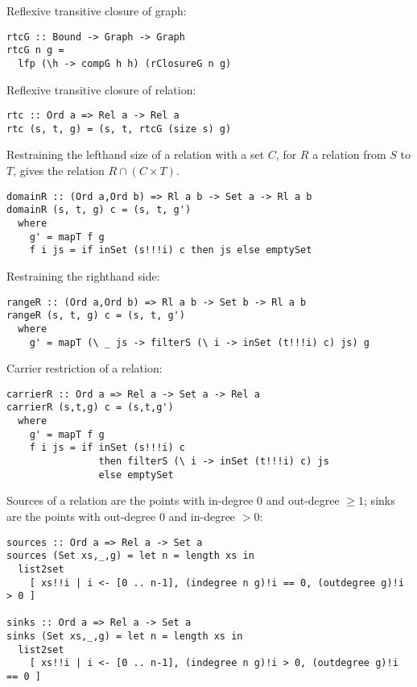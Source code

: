 Reflexive transitive closure of graph: 

\bc\begin{verbatim}
rtcG :: Bound -> Graph -> Graph 
rtcG n g = 
  lfp (\h -> compG h h) (rClosureG n g)
\end{verbatim}\ec

Reflexive transitive closure of relation:

\bc\begin{verbatim}
rtc :: Ord a => Rel a -> Rel a
rtc (s, t, g) = (s, t, rtcG (size s) g)
\end{verbatim}\ec

Restraining the lefthand size of a relation with a set $C$, 
for $R$ a relation  from $S$ to $T$, gives the relation 
 $R \cap (C \times T)$. 

\bc\begin{verbatim}
domainR :: (Ord a,Ord b) => Rl a b -> Set a -> Rl a b 
domainR (s, t, g) c = (s, t, g') 
  where 
    g' = mapT f g
    f i js = if inSet (s!!!i) c then js else emptySet
\end{verbatim}\ec

Restraining the righthand side: 

\bc\begin{verbatim}
rangeR :: (Ord a,Ord b) => Rl a b -> Set b -> Rl a b 
rangeR (s, t, g) c = (s, t, g') 
  where 
    g' = mapT (\ _ js -> filterS (\ i -> inSet (t!!!i) c) js) g
\end{verbatim}\ec

Carrier restriction of a relation: 

\bc\begin{verbatim}
carrierR :: Ord a => Rel a -> Set a -> Rel a 
carrierR (s,t,g) c = (s,t,g') 
  where 
    g' = mapT f g
    f i js = if inSet (s!!!i) c
                then filterS (\ i -> inSet (t!!!i) c) js 
                else emptySet
\end{verbatim}\ec

Sources of a relation are the points with in-degree $0$ and out-degree
$\geq 1$; sinks are the points with out-degree $0$ and in-degree $> 0$: 

\bc\begin{verbatim}
sources :: Ord a => Rel a -> Set a
sources (Set xs,_,g) = let n = length xs in 
  list2set 
    [ xs!!i | i <- [0 .. n-1], (indegree n g)!i == 0, (outdegree g)!i > 0 ]

sinks :: Ord a => Rel a -> Set a
sinks (Set xs,_,g) = let n = length xs in 
  list2set 
    [ xs!!i | i <- [0 .. n-1], (indegree n g)!i > 0, (outdegree g)!i == 0 ]
\end{verbatim}\ec

